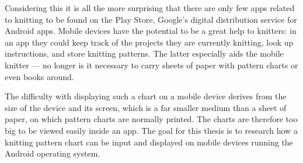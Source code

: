 Considering this it is all the more surprising that there are only few apps related to knitting to be found on the Play Store, Google's digital distribution service for Android apps. Mobile devices have the potential to be a great help to knitters: in an app they could keep track of the projects they are currently knitting, look up instructions, and store knitting patterns. The latter especially aids the mobile knitter --- no longer is it necessary to carry sheets of paper with pattern charts or even books around.

The difficulty with displaying such a chart on a mobile device derives from the size of the device and its screen, which is a far smaller medium than a sheet of paper, on which pattern charts are normally printed. The charts are therefore too big to be viewed easily inside an app. The goal for this thesis is to research how a knitting pattern chart can be input and displayed on mobile devices running the Android operating system.